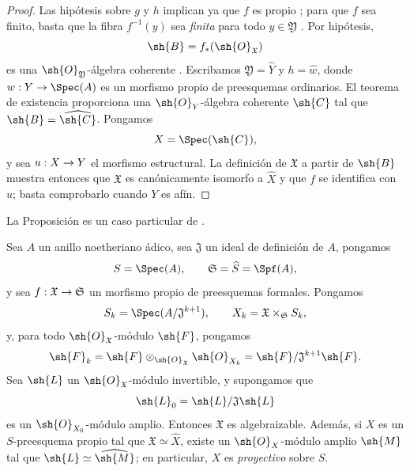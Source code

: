 \documentclass[oneside]{amsart}
\makeatletter
\newcommand{\ega@arrow}[2]{\mathchoice{#1}{#2}{#2}{#2}}
\renewcommand{\to}{\ega@arrow{\longrightarrow}{\rightarrow}}
\newcommand{\oldpage}[2][]{{\marginnote{\normalfont\textbf{#1}~|~#2}}\ignorespaces}
\let\EGAOriginalLabel\label
\renewcommand{\label}[1]{\phantomsection\EGAOriginalLabel{#1}}
\makeatother
\begin{document}
\begin{proof}
Las hipótesis sobre $g$ y $h$ implican ya que $f$ es propio
; para que $f$ sea finito, basta que la fibra
$f^{-1}(y)$ sea \emph{finita} para todo $y\in\mathfrak{Y}$
. Por hipótesis,
\[
  \sh{B}=f_*(\sh{O}_{\mathfrak{X}})
\]
es una $\sh{O}_{\mathfrak{Y}}$-álgebra coherente
. Escribamos
$\mathfrak{Y}=\widehat{Y}$ y $h=\widehat{w}$, donde
$w:Y\to\Spec(A)$ es un morfismo propio de preesquemas ordinarios. El
teorema de existencia proporciona una $\sh{O}_Y$-álgebra coherente $\sh{C}$
tal que $\sh{B}=\widehat{\sh{C}}$. Pongamos
\[
  X=\Spec(\sh{C}),
\]
y sea $u:X\to Y$ el morfismo estructural. La definición de
$\mathfrak{X}$ a partir de $\sh{B}$  muestra entonces que
$\mathfrak{X}$ es canónicamente isomorfo a $\widehat{X}$ y
que $f$ se identifica con $\widehat{u}$; basta comprobarlo
cuando $Y$ es afín.
\end{proof}

La Proposición  es un caso particular de
.

\begin{theorem}[5.4.5]
\label{III.5.4.5}
Sea $A$ un anillo noetheriano ádico, sea $\mathfrak{J}$ un ideal
de definición de $A$, pongamos
\[
  S=\Spec(A),\qquad
  \mathfrak{S}=\widehat{S}=\Spf(A),
\]
y sea $f:\mathfrak{X}\to\mathfrak{S}$ un morfismo propio de
preesquemas formales. Pongamos
\[
  S_k=\Spec(A/\mathfrak{J}^{k+1}),\qquad
  X_k=\mathfrak{X}\times_{\mathfrak{S}}S_k,
\]
y, para todo $\sh{O}_{\mathfrak{X}}$-módulo $\sh{F}$, pongamos
\[
  \sh{F}_k
  =\sh{F}\otimes_{\sh{O}_{\mathfrak{X}}}\sh{O}_{X_k}
  =\sh{F}/\mathfrak{J}^{k+1}\sh{F}.
\]
\oldpage[III]{158}
Sea $\sh{L}$ un
$\sh{O}_{\mathfrak{X}}$-módulo invertible, y supongamos que
\[
  \sh{L}_0=\sh{L}/\mathfrak{J}\sh{L}
\]
es un $\sh{O}_{X_0}$-módulo amplio. Entonces $\mathfrak{X}$ es
algebraizable. Además, si $X$ es un $S$-preesquema propio tal
que $\mathfrak{X}\simeq\widehat{X}$, existe un
$\sh{O}_X$-módulo amplio $\sh{M}$ tal que
$\sh{L}\simeq\widehat{\sh{M}}$; en particular, $X$ es \emph{proyectivo}
sobre $S$.
\end{theorem}
\end{document}

